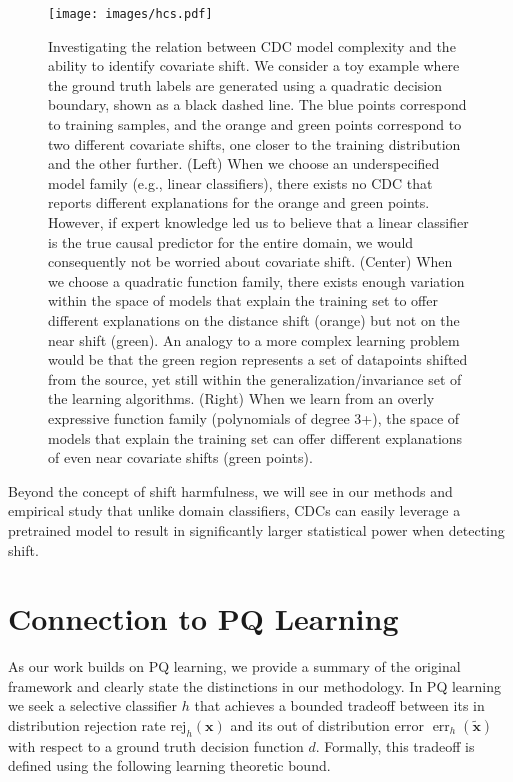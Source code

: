 \begin{figure}[!htb]
    \centering
    \texttt{[image: images/hcs.pdf]}
    \caption{\small Investigating the relation between CDC model complexity and the ability to identify covariate shift.
    We consider a toy example where the ground truth labels are generated using a quadratic decision boundary, shown as a black dashed line.
    The blue points correspond to training samples, and the orange and green points correspond to two different covariate shifts, one closer to the training distribution and the other further.
        (Left) When we choose an underspecified model family (e.g., linear classifiers), there exists no CDC that reports different explanations for the orange and green points.
        However, if expert knowledge led us to believe that a linear classifier is the true causal predictor for the entire domain, we would consequently not be worried about covariate shift.
        (Center) When we choose a quadratic function family, there exists enough variation within the space of models that explain the training set to offer different explanations on the distance shift (orange) but not on the near shift (green).
        An analogy to a more complex learning problem would be that the green region represents a set of datapoints shifted from the source, yet still within the generalization/invariance set of the learning algorithms.
        (Right) When we learn from an overly expressive function family (polynomials of degree 3+), the space of models that explain the training set can offer different explanations of even near covariate shifts (green points).}
    \label{fig:hcs}
\end{figure}

Beyond the concept of shift harmfulness, we will see in our methods and empirical study that unlike domain classifiers, CDCs can easily leverage a pretrained model to result in significantly larger statistical power when detecting shift.


\section{Connection to PQ Learning}\label{sec:relationship-with-pq-learning}

As our work builds on PQ learning, we provide a summary of the original framework and clearly state the distinctions in our methodology.
In PQ learning we seek a selective classifier $h$ that achieves
a bounded tradeoff between its in distribution rejection rate $\text{rej}_h(\mathbf{x})$ and its out of distribution error $\operatorname{err}_h(\tilde{\mathbf{x}})$ with respect to a ground truth decision function $d$.
Formally, this tradeoff is defined using the following learning theoretic bound.

